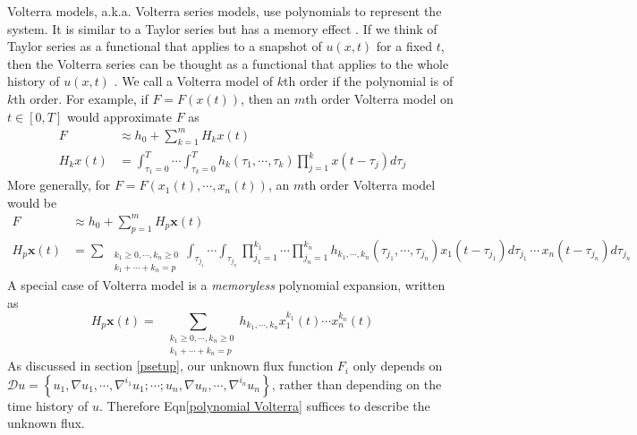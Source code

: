 \documentclass[a4paper,onecolumn]{article}
\theoremstyle{remark}
\begin{document}
\noindent Volterra models, a.k.a. Volterra series models, use polynomials to represent 
the system. It is similar to a Taylor series but has a memory effect \cite{volterra 1, volterra 2}.
If we think of Taylor series as a functional that applies to a snapshot of $u(x,t)$ for
a fixed $t$, then the Volterra series can be thought as a functional that applies to
the whole history of $u(x,t)$ \cite{NARMAXbook}.
We call a Volterra model of $k$th order if the polynomial is of $k$th order.
For example, if $F = F(x(t))$, then an $m$th order Volterra model on
$t\in [0,T]$
would approximate $F$ as
\begin{equation}\begin{split}
    F &\approx h_0 + \sum_{k=1}^m H_k x(t)\\
    H_k x(t) &= \int_{\tau_1=0}^T \cdots \int_{\tau_k=0}^T 
    h_k(\tau_1, \cdots, \tau_k) \prod_{j=1}^k x(t-\tau_j) d\tau_j
\end{split}\end{equation}
More generally, for $F = F(x_1(t),\cdots, x_n(t))$, an $m$th order Volterra model would be
\cite{volterra 1}
\begin{equation}\begin{split}
    F & \approx h_0 + \sum_{p=1}^m H_p \mathbf{x}(t)\\
    H_p \mathbf{x}(t) &= \sum_{
        \begin{split}
           & \scriptscriptstyle k_1\ge 0,\cdots,k_n\ge 0\\[-2.3mm]
           & \scriptscriptstyle k_1+\cdots+k_n=p
        \end{split}
    }
    \int_{\tau_{j_1}} \cdots \int_{\tau_{j_n}} 
    \prod_{j_1=1}^{k_1} \cdots \prod_{j_n=1}^{k_n}
    h_{k_1,\cdots,k_n}(\tau_{j_1}, \cdots, \tau_{j_n})
    x_1(t-\tau_{j_1}) d\tau_{j_1}\, \cdots\,
    x_n(t-\tau_{j_n}) d\tau_{j_n}
\end{split}\end{equation}
A special case of Volterra model is a \emph{memoryless} polynomial expansion, written as
\begin{equation}
    H_p \mathbf{x}(t)= \sum_{
        \begin{split}
           & \scriptscriptstyle k_1\ge 0,\cdots,k_n \ge 0\\[-2.3mm]
           & \scriptscriptstyle k_1+\cdots+k_n=p
        \end{split}
    }
    h_{k_1,\cdots,k_n}
    x_1^{k_1}(t) \cdots x_n^{k_n}(t)
    \label{polynomial Volterra}
\end{equation}
As discussed in section \ref{psetup}, our unknown flux function
$F_i$ only depends on \\
$\mathcal{D}u = \left\{u_1, \nabla u_1 , \cdots, \nabla^{i_1} u_1; \cdots;
u_n, \nabla u_n,\cdots, \nabla^{i_n} u_n\right\}$, rather than depending on the time history of $u$.
Therefore Eqn\eqref{polynomial Volterra} suffices to describe the unknown flux.\\
\end{document}
